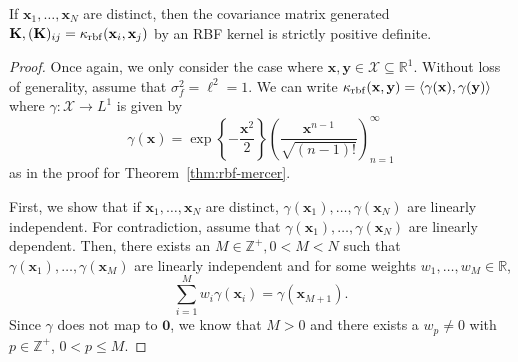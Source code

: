 \begin{lemma}
    \label{lem:rbf-pd}
    If $\mathbf{x}_1, \dots, \mathbf{x}_N$ are distinct, then the covariance matrix generated $\mathbf{K}, (\mathbf{K})_{ij} = \kappa_{\mathrm{rbf}}(\mathbf{x}_i, \mathbf{x}_j)$ by an RBF kernel is strictly positive definite.
\end{lemma}
\begin{proof}
    Once again, we only consider the case where $\mathbf{x}, \mathbf{y} \in \mathcal{X} \subseteq \mathbb{R}^{1}$.
    Without loss of generality, assume that $\sigma_f^2 = \ell^2 = 1$.
    We can write $\kappa_{\mathrm{rbf}}(\mathbf{x}, \mathbf{y}) = \langle \gamma(\mathbf{x}), \gamma(\mathbf{y}) \rangle$
    where $\gamma: \mathcal{X} \to L^{1}$ is given by
    \begin{equation*}
        \gamma(\mathbf{x}) = \exp\left\{-\frac{\mathbf{x}^2}2 \right\} \left(\frac{ \mathbf{x}^{n - 1} }{ \sqrt{(n - 1)!} }\right)_{n=1}^{\infty}
    \end{equation*}
    as in the proof for Theorem~\ref{thm:rbf-mercer}.

    First, we show that if $\mathbf{x}_1, \dots, \mathbf{x}_N$ are distinct, $\gamma(\mathbf{x}_1), \dots, \gamma(\mathbf{x}_N)$ are linearly independent.
    For contradiction, assume that $\gamma(\mathbf{x}_1), \dots, \gamma(\mathbf{x}_N)$ are linearly dependent.
    Then, there exists an $M \in \mathbb{Z}^{+}, 0 < M < N$ such that $\gamma(\mathbf{x}_1), \dots, \gamma(\mathbf{x}_M)$
    are linearly independent and for some weights $w_1, \dots, w_M \in \mathbb{R}$,
    \begin{equation}
        \label{eq:dep}
        \sum_{i = 1}^{M}w_i \gamma(\mathbf{x}_i)  = \gamma(\mathbf{x}_{M + 1}).
    \end{equation}
    Since $\gamma$ does not map to $\mathbf{0}$, we know that $M > 0$ and there exists a $w_p \neq 0$ with $p \in \mathbb{Z}^{+}$, $0 < p \leq M$.


\end{proof}

